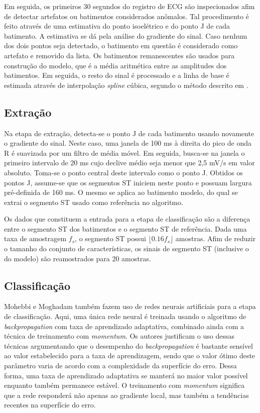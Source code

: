 Em seguida, os primeiros 30 segundos do registro de ECG são inspecionados afim de detectar artefatos ou batimentos considerados anômalos. Tal procedimento é feito através de uma estimativa do ponto isoelétrico e do ponto J de cada batimento. A estimativa se dá pela análise do gradiente do sinal. Caso nenhum dos dois pontos seja detectado, o batimento em questão é considerado como artefato e removido da lista. Os batimentos remanescentes são usados para construção do modelo, que é a média aritmética entre as amplitudes dos batimentos. Em seguida, o resto do sinal é processado e a linha de base é estimada através de interpolação \emph{spline} cúbica, segundo o método descrito em \cite{Badilini1991}.

\subsection*{Extração}
Na etapa de extração, detecta-se o ponto J de cada batimento usando novamente o gradiente do sinal. Neste caso, uma janela de 100 ms à direita do pico de onda R é suavizada por um filtro de média móvel. Em seguida, busca-se na janela o primeiro intervalo de 20 ms cujo declive médio seja menor que 2,5 mV/s em valor absoluto. Toma-se o ponto central deste intervalo como o ponto J. Obtidos os pontos J, assume-se que os segmentos ST iniciem neste ponto e possuam largura pré-definida de 160 ms. O mesmo se aplica ao batimento modelo, do qual se extrai o segmento ST usado como referência no algoritmo.

Os dados que constituem a entrada para a etapa de classificação são a diferença entre o segmento ST dos batimentos e o segmento ST de referência. Dada uma taxa de amostragem $f_s$, o segmento ST possui $\lfloor0.16f_s\rfloor$ amostras. Afim de reduzir o tamanho do conjunto de características, os sinais de segmento ST (inclusive o do modelo) são reamostrados para 20 amostras.

\subsection*{Classificação}
Mohebbi e Moghadam também fazem uso de redes neurais artificiais para a etapa de classificação. Aqui, uma única rede neural é treinada usando o algoritmo de \emph{backpropagation} com taxa de aprendizado adaptativa, combinado ainda com a técnica de treinamento com \emph{momentum}. Os autores justificam o uso dessas técnicas argumentando que o desempenho do \emph{backpropagation} é bastante sensível ao valor estabelecido para a taxa de aprendizagem, sendo que o valor ótimo deste parâmetro varia de acordo com a complexidade da superfície do erro. Dessa forma, uma taxa de aprendizado adaptativa se manterá no maior valor possível enquanto também permanece estável. O treinamento com \emph{momentum} significa que a rede responderá não apenas ao gradiente local, mas também a tendências recentes na superfície do erro.


